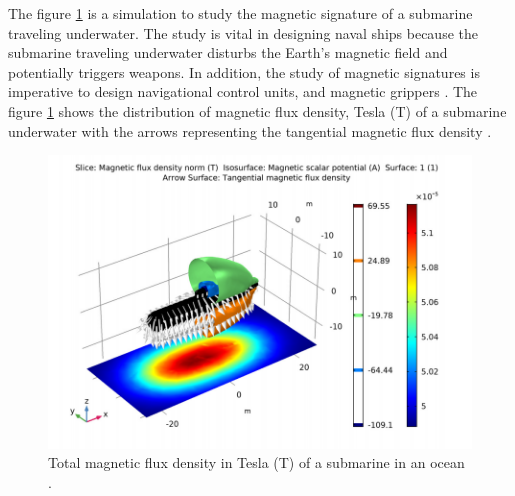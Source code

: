 The figure \ref{Fig:submarine} is a simulation to study the magnetic signature of a submarine traveling underwater. The study is vital in designing naval ships because the submarine traveling underwater disturbs the Earth's magnetic field and potentially triggers weapons. In addition, the study of magnetic signatures is imperative to design navigational control units, and magnetic grippers \cite{submarine}. The figure \ref{Fig:submarine} shows the distribution of magnetic flux density, Tesla (T) of a submarine underwater with the arrows representing the tangential magnetic flux density \cite{submarine}.

\begin{figure}[!ht]
\centering
\includegraphics[width=\textwidth]{images/submarine.png}
\captionsetup{justification=justified}
\caption[Multiphysics simulation example- Magnetic flux study of a submarine]{Total magnetic flux density in Tesla (T) of a submarine in an ocean \cite{submarine}.}
\label{Fig:submarine}
\end{figure}





